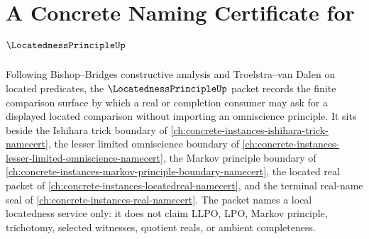 \chapter{A Concrete Naming Certificate for $\LocatednessPrincipleUp$}
\label{ch:concrete-instances-locatedness-principle-namecert}

Following Bishop--Bridges constructive analysis and Troelstra--van Dalen on located predicates, the $\LocatednessPrincipleUp$ packet records the finite comparison surface by which a real or completion consumer may ask for a displayed located comparison without importing an omniscience principle. It sits beside the Ishihara trick boundary of \autoref{ch:concrete-instances-ishihara-trick-namecert}, the lesser limited omniscience boundary of \autoref{ch:concrete-instances-lesser-limited-omniscience-namecert}, the Markov principle boundary of \autoref{ch:concrete-instances-markov-principle-boundary-namecert}, the located real packet of \autoref{ch:concrete-instances-locatedreal-namecert}, and the terminal real-name seal of \autoref{ch:concrete-instances-real-namecert}. The packet names a local locatedness service only: it does not claim LLPO, LPO, Markov principle, trichotomy, selected witnesses, quotient reals, or ambient completeness.

